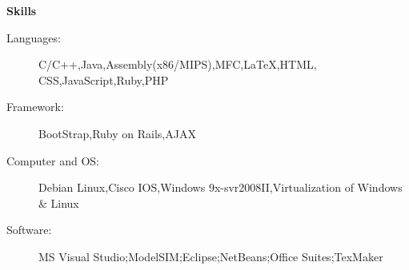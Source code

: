 \documentclass[letterpaper,11pt]{article}
\newcommand{\resheading}[1]{{\large \colorbox{mygrey}{\begin{minipage}{\textwidth}{\textbf{#1 \vphantom{p\^{E}}}}\end{minipage}}}}
\begin{document}
	

\resheading{Skills}
	\begin{description}
		\item[Languages:] { \footnotesize C/C++,Java,Assembly(x86/MIPS),MFC,LaTeX,HTML, CSS,JavaScript,Ruby,PHP}
		\item[Framework:] { \footnotesize BootStrap,Ruby on Rails,AJAX}
		\item[Computer and OS:] { \footnotesize Debian Linux,Cisco IOS,Windows 9x-svr2008II,Virtualization of Windows \& Linux}
		\item[Software:]{\footnotesize {MS Visual Studio};{ModelSIM};{Eclipse};{NetBeans};{Office Suites};{TexMaker}}  
	\end{description} %
\end{document}
